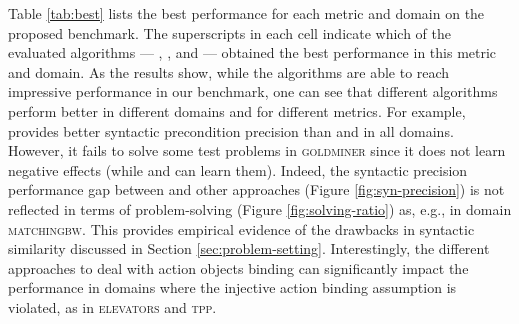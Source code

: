 
Table \ref{tab:best} lists the best performance for each metric and domain on the proposed benchmark. The superscripts in each cell indicate which of the evaluated algorithms --- \sam{}, \offlam{}, and \nolam{} --- obtained the best performance in this metric and domain. As the results show, while the algorithms are able to reach impressive performance in our benchmark, one can see that different algorithms perform better in different domains and for different metrics. 
For example, \offlam{} provides better syntactic precondition precision than \samshort{} and \nolam{} in all domains. However, it fails to solve some test problems in \textsc{goldminer} since it does not learn negative effects (while \sam and \offlam{} can learn them). 
Indeed, the syntactic precision performance gap between \offlam{} and other approaches (Figure \ref{fig:syn-precision}) is not reflected in terms of problem-solving (Figure \ref{fig:solving-ratio}) as, e.g., in domain \textsc{matchingbw}. 
This provides empirical evidence of the drawbacks in syntactic similarity discussed in Section \ref{sec:problem-setting}.
Interestingly, the different approaches to deal with action objects binding can significantly impact the performance in domains where the injective action binding assumption is violated, as in \textsc{elevators} and \textsc{tpp}.  


